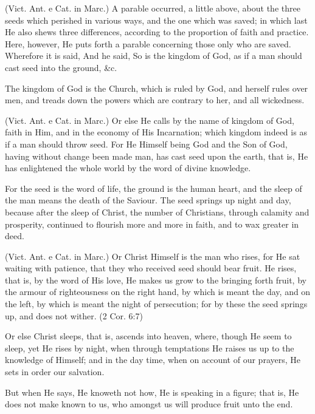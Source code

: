  (Vict. Ant. e Cat. in Marc.) A parable occurred, a little above, about the three seeds which perished in various ways, and the one which was saved; in which last He also shews three differences, according to the proportion of faith and practice. Here, however, He puts forth a parable concerning those only who are saved. Wherefore it is said, And he said, So is the kingdom of God, as if a man should cast seed into the ground, \&c.

 The kingdom of God is the Church, which is ruled by God, and herself rules over men, and treads down the powers which are contrary to her, and all wickedness.

 (Vict. Ant. e Cat. in Marc.) Or else He calls by the name of kingdom of God, faith in Him, and in the economy of His Incarnation; which kingdom indeed is as if a man should throw seed. For He Himself being God and the Son of God, having without change been made man, has cast seed upon the earth, that is, He has enlightened the whole world by the word of divine knowledge.

 For the seed is the word of life, the ground is the human heart, and the sleep of the man means the death of the Saviour. The seed springs up night and day, because after the sleep of Christ, the number of Christians, through calamity and prosperity, continued to flourish more and more in faith, and to wax greater in deed.

 (Vict. Ant. e Cat. in Marc.) Or Christ Himself is the man who rises, for He sat waiting with patience, that they who received seed should bear fruit. He rises, that is, by the word of His love, He makes us grow to the bringing forth fruit, by the armour of righteousness on the right hand, by which is meant the day, and on the left, by which is meant the night of persecution; for by these the seed springs up, and does not wither. (2 Cor. 6:7)

 Or else Christ sleeps, that is, ascends into heaven, where, though He seem to sleep, yet He rises by night, when through temptations He raises us up to the knowledge of Himself; and in the day time, when on account of our prayers, He sets in order our salvation.

 But when He says, He knoweth not how, He is speaking in a figure; that is, He does not make known to us, who amongst us will produce fruit unto the end.


